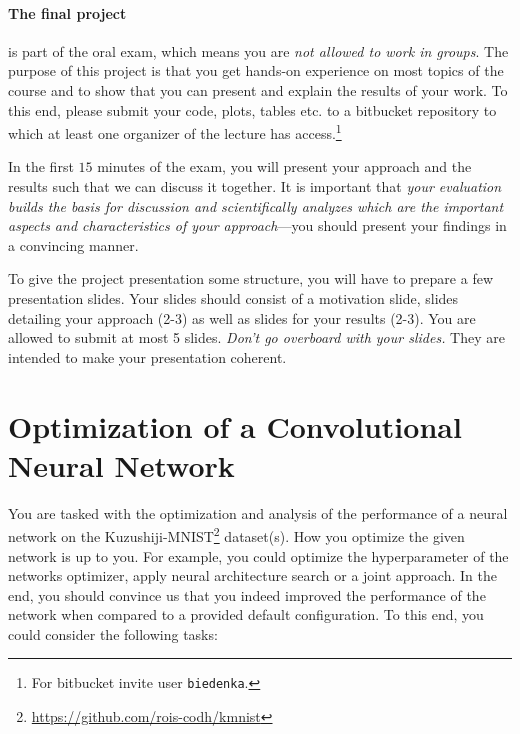 \documentclass[10pt,a4paper]{article}
\begin{document}
	\paragraph{The final project} is part of the oral exam, which means you are \textit{not allowed to work in groups}.
	The purpose of this project is that you get hands-on experience on most topics of the course and to show that you can present and explain the results of your work. 
	To this end, please submit your code, plots, tables etc. to a bitbucket repository to which at least one organizer of the lecture has access.\footnote{
	For bitbucket invite user \texttt{biedenka}.}

	In the first $15$ minutes of the exam, you will present your approach and the results such that we can discuss it together.
	It is important that \textit{your evaluation builds the basis for discussion and scientifically analyzes which are the important aspects and characteristics of your approach}---you should present your findings in a convincing manner.
	
	To give the project presentation some structure, you will have to prepare a few presentation slides.
	Your slides should consist of a motivation slide, slides detailing your approach (2-3) as well as slides for your results (2-3).
	You are allowed to submit at most 5 slides.
	\textit{Don't go overboard with your slides.}
	They are intended to make your presentation coherent.
	
	\section*{Optimization of a Convolutional Neural Network}
		
		You are tasked with the optimization and analysis of the performance of a neural network on the Kuzushiji-MNIST\footnote{\url{https://github.com/rois-codh/kmnist}} dataset(s).
		How you optimize the given network is up to you. 
		For example, you could optimize the hyperparameter of the networks optimizer, apply neural architecture search or a joint approach.
		In the end, you should convince us that you indeed improved the performance of the network when compared to a provided default configuration.
		To this end, you could consider the following tasks:
		
\end{document}

